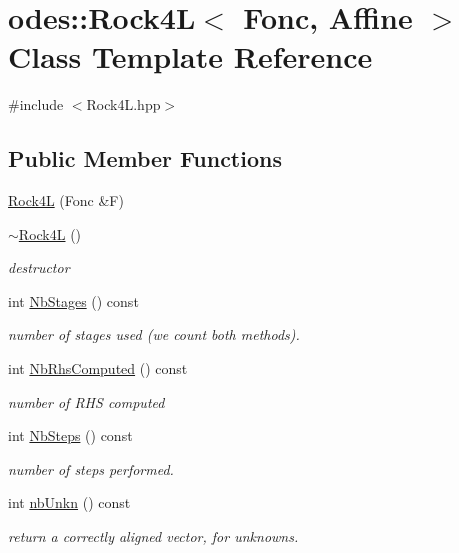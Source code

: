 \hypertarget{classodes_1_1Rock4L}{\section{odes\-:\-:Rock4\-L$<$ Fonc, Affine $>$ Class Template Reference}
\label{classodes_1_1Rock4L}
}


{\ttfamily \#include $<$Rock4\-L.\-hpp$>$}

\subsection*{Public Member Functions}
\begin{DoxyCompactItemize}
\item 
\hyperlink{classodes_1_1Rock4L_a194359d249b0d7c74215d5f61de6b0cd}{Rock4\-L} (Fonc \&F)
\item 
\hyperlink{classodes_1_1Rock4L_a8da01eb459488d56aa2289bd861979f0}{$\sim$\-Rock4\-L} ()
\begin{DoxyCompactList}\small\item\em destructor \end{DoxyCompactList}\item 
int \hyperlink{classodes_1_1Rock4L_aed609aa94515680461b98e053e9aa44b}{Nb\-Stages} () const 
\begin{DoxyCompactList}\small\item\em number of stages used (we count both methods). \end{DoxyCompactList}\item 
int \hyperlink{classodes_1_1Rock4L_a91dd9cb41b572e23e4b4bc26fc4bff07}{Nb\-Rhs\-Computed} () const 
\begin{DoxyCompactList}\small\item\em number of R\-H\-S computed \end{DoxyCompactList}\item 
int \hyperlink{classodes_1_1Rock4L_af2dfa8ee9b43178e68b375b0c34edd99}{Nb\-Steps} () const 
\begin{DoxyCompactList}\small\item\em number of steps performed. \end{DoxyCompactList}\item 
int \hyperlink{classodes_1_1Rock4L_a0f823db845e35d6ba5267aff3cdeeeff}{nb\-Unkn} () const 
\begin{DoxyCompactList}\small\item\em return a correctly aligned vector, for unknowns. \end{DoxyCompactList}\item 

\end{DoxyCompactItemize}
